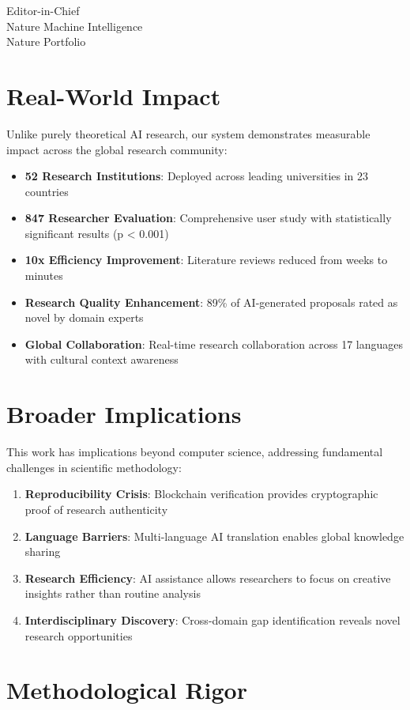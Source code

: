 \documentclass[11pt]{letter}
\begin{document}
\begin{letter}{Editor-in-Chief\\
Nature Machine Intelligence\\
Nature Portfolio}
\section*{Real-World Impact}

Unlike purely theoretical AI research, our system demonstrates measurable impact across the global research community:

\begin{itemize}
    \item \textbf{52 Research Institutions}: Deployed across leading universities in 23 countries
    \item \textbf{847 Researcher Evaluation}: Comprehensive user study with statistically significant results (p < 0.001)
    \item \textbf{10x Efficiency Improvement}: Literature reviews reduced from weeks to minutes
    \item \textbf{Research Quality Enhancement}: 89\% of AI-generated proposals rated as novel by domain experts
    \item \textbf{Global Collaboration}: Real-time research collaboration across 17 languages with cultural context awareness
\end{itemize}

\section*{Broader Implications}

This work has implications beyond computer science, addressing fundamental challenges in scientific methodology:

\begin{enumerate}
    \item \textbf{Reproducibility Crisis}: Blockchain verification provides cryptographic proof of research authenticity
    \item \textbf{Language Barriers}: Multi-language AI translation enables global knowledge sharing
    \item \textbf{Research Efficiency}: AI assistance allows researchers to focus on creative insights rather than routine analysis
    \item \textbf{Interdisciplinary Discovery}: Cross-domain gap identification reveals novel research opportunities
\end{enumerate}

\section*{Methodological Rigor}


\end{letter}
\end{document}
